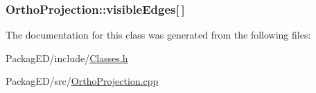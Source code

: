 \subsubsection[{\texorpdfstring{visible\+Edges}{visibleEdges}}]{ Ortho\+Projection\+::visible\+Edges\mbox{[}$\,$\mbox{]}}\hypertarget{class_ortho_projection_a8903896a5a8facc50585ea50584617a1}{}\label{class_ortho_projection_a8903896a5a8facc50585ea50584617a1}


The documentation for this class was generated from the following files\+:\begin{DoxyCompactItemize}
\item 
Packag\+E\+D/include/\hyperlink{_classes_8h}{Classes.\+h}\item 
Packag\+E\+D/src/\hyperlink{_ortho_projection_8cpp}{Ortho\+Projection.\+cpp}\end{DoxyCompactItemize}
